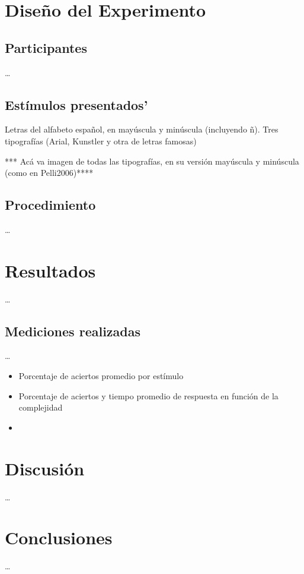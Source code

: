 \documentclass[runningheads,a4paper]{llncs}
\begin{document}
\section{Dise\~no del Experimento}
\label{sec:DisenoExperimento}

\subsection{Participantes}
\ldots

\subsection{Est\'imulos presentados'}
Letras del alfabeto español, en mayúscula y minúscula (incluyendo ñ).
Tres tipografías (Arial, Kunstler y otra de letras famosas)

*** Acá va imagen de todas las tipografías, en su versión mayúscula y minúscula  (como en Pelli2006)****

\subsection{Procedimiento}
\ldots

\section{Resultados}
\ldots

\subsection{Mediciones realizadas}
\ldots
\begin{itemize}
 \item Porcentaje de aciertos promedio por estímulo
 \item Porcentaje de aciertos y tiempo promedio de respuesta en función de la complejidad
 \item 

\end{itemize}


\section{Discusi\'on}
\ldots

\section{Conclusiones}
\ldots
\end{document}
